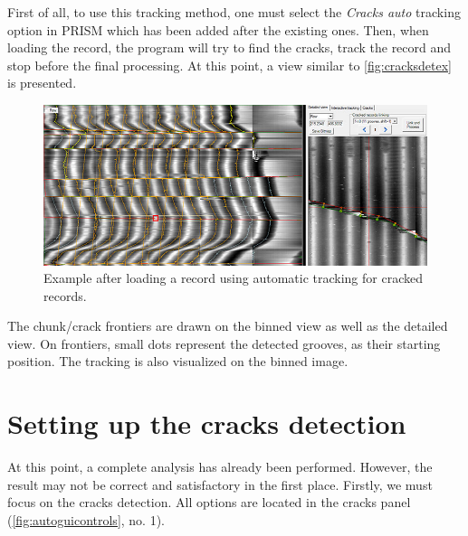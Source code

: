 First of all, to use this tracking method, one must select the \emph{Cracks auto} tracking option in PRISM which has been added after the existing ones. Then, when loading the record, the program will try to find the cracks, track the record and stop before the final processing. At this point, a view similar to \autoref{fig:cracksdetex} is presented.

\begin{figure}[!ht]
\centering
\includegraphics[width=1.0\textwidth]{images/cracks-det-ex}
\caption{Example after loading a record using automatic tracking for cracked records.}
\label{fig:cracksdetex}
\end{figure}

The chunk/crack frontiers are drawn on the binned view as well as the detailed view. On frontiers, small dots represent the detected grooves, as their starting position. The tracking is also visualized on the binned image.

\section{Setting up the cracks detection}

At this point, a complete analysis has already been performed. However, the result may not be correct and satisfactory in the first place. Firstly, we must focus on the cracks detection. All options are located in the cracks panel (\autoref{fig:autoguicontrols}, no. 1).

